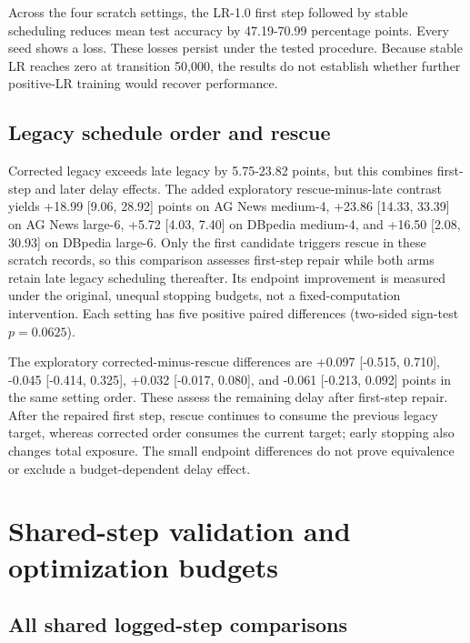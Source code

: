 \documentclass[referee,pdflatex,sn-mathphys-num]{sn-jnl}
\begin{document}
Across the four scratch settings, the LR-1.0 first step followed by stable scheduling reduces mean test accuracy by 47.19-70.99 percentage points. Every seed shows a loss. These losses persist under the tested procedure. Because stable LR reaches zero at transition 50,000, the results do not establish whether further positive-LR training would recover performance.

\subsection{Legacy schedule order and rescue}\label{legacy-schedule-order-and-rescue}

Corrected legacy exceeds late legacy by 5.75-23.82 points, but this combines first-step and later delay effects. The added exploratory rescue-minus-late contrast yields +18.99 {[}9.06, 28.92{]} points on AG News medium-4, +23.86 {[}14.33, 33.39{]} on AG News large-6, +5.72 {[}4.03, 7.40{]} on DBpedia medium-4, and +16.50 {[}2.08, 30.93{]} on DBpedia large-6. Only the first candidate triggers rescue in these scratch records, so this comparison assesses first-step repair while both arms retain late legacy scheduling thereafter. Its endpoint improvement is measured under the original, unequal stopping budgets, not a fixed-computation intervention. Each setting has five positive paired differences (two-sided sign-test \(p=0.0625\)).

The exploratory corrected-minus-rescue differences are +0.097 {[}-0.515, 0.710{]}, -0.045 {[}-0.414, 0.325{]}, +0.032 {[}-0.017, 0.080{]}, and -0.061 {[}-0.213, 0.092{]} points in the same setting order. These assess the remaining delay after first-step repair. After the repaired first step, rescue continues to consume the previous legacy target, whereas corrected order consumes the current target; early stopping also changes total exposure. The small endpoint differences do not prove equivalence or exclude a budget-dependent delay effect.

\section{Shared-step validation and optimization budgets}\label{shared-step-validation-and-optimization-budgets}

\subsection{All shared logged-step comparisons}\label{all-shared-logged-step-comparisons}
\end{document}
